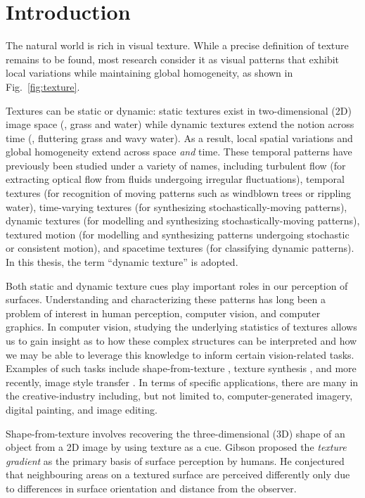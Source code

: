 \chapter{Introduction}

The natural world is rich in visual texture. While a precise definition of 
texture remains to be found, most research consider it as visual patterns that 
exhibit local variations while maintaining global homogeneity, as shown in Fig.\ \ref{fig:texture}.



Textures 
can be static or dynamic: static textures exist in two-dimensional (2D) image space 
(\eg, grass and water) while dynamic textures extend the notion across time (\eg, 
fluttering grass and wavy water). As a result, local spatial variations and 
global homogeneity extend across space \emph{and} time. These temporal patterns 
have previously been studied under a variety of names, including turbulent flow \cite{heeger1986} (for extracting optical flow from fluids undergoing irregular fluctuations), temporal textures \cite{nelson1992} (for recognition of moving patterns such as windblown trees or rippling water), time-varying 
textures \cite{bar-joseph2001} (for synthesizing stochastically-moving patterns), dynamic textures \cite{doretto2003} (for modelling and synthesizing stochastically-moving patterns), textured 
motion \cite{wang2003} (for modelling and synthesizing patterns undergoing stochastic or consistent motion), and spacetime textures \cite{derpanis2012spacetime} (for classifying dynamic patterns).
In this thesis, the term ``dynamic texture'' is adopted.

Both static and dynamic texture cues play important roles in our perception of 
surfaces. Understanding and characterizing these patterns has long been a problem 
of interest in human perception, computer vision, and computer graphics. In 
computer vision, studying the underlying statistics of textures allows us to gain 
insight as to how these complex structures can be interpreted and how we may be 
able to leverage this knowledge to inform certain vision-related tasks. Examples 
of such tasks include shape-from-texture \cite{gibson1950perception}, texture 
synthesis \cite{heeger1995pyramid}, and more recently, image style transfer 
\cite{gatys2016image}. In terms of specific applications, 
there are many in the creative-industry including, but not limited to, computer-generated imagery, digital painting, and image editing.

Shape-from-texture involves recovering the
three-dimensional (3D) shape of an object from a 2D image by using texture as a 
cue. Gibson \cite{gibson1950perception} proposed the \emph{texture gradient} as 
the primary basis of surface perception by humans. He conjectured that neighbouring areas on a textured surface are perceived differently only due to differences
in surface orientation and distance from the observer.

